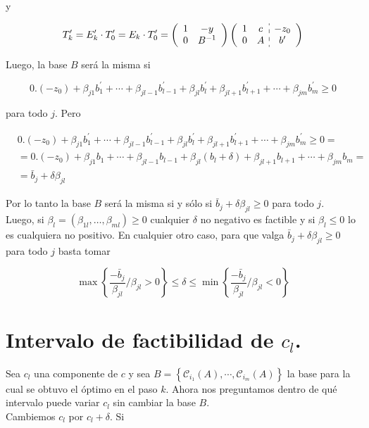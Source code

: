 \documentclass[10pt]{article}
\begin{document}
y

$$
T_{k}^{\prime}=E_{k}^{\prime} \cdot T_{0}^{\prime}=E_{k} \cdot T_{0}^{\prime}=\left(\begin{array}{cc}
1 & -y \\
0 & B^{-1}
\end{array}\right)\left(\begin{array}{cc:c}
1 & c & -z_{0} \\
0 & A & b^{\prime}
\end{array}\right)
$$

Luego, la base $B$ será la misma si

$$
0 .\left(-z_{0}\right)+\beta_{j 1} b_{1}^{\prime}+\cdots+\beta_{j l-1} b_{l-1}^{\prime}+\beta_{j l} b_{l}^{\prime}+\beta_{j l+1} b_{l+1}^{\prime}+\cdots+\beta_{j m} b_{m}^{\prime} \geq 0
$$

para todo $j$. Pero

$$
\begin{aligned}
& 0 .\left(-z_{0}\right)+\beta_{j 1} b_{1}^{\prime}+\cdots+\beta_{j l-1} b_{l-1}^{\prime}+\beta_{j l} b_{l}^{\prime}+\beta_{j l+1} b_{l+1}^{\prime}+\cdots+\beta_{j m} b_{m}^{\prime} \geq 0= \\
& =0 .\left(-z_{0}\right)+\beta_{j 1} b_{1}+\cdots+\beta_{j l-1} b_{l-1}+\beta_{j l}\left(b_{l}+\delta\right)+\beta_{j l+1} b_{l+1}+\cdots+\beta_{j m} b_{m}= \\
& =\bar{b}_{j}+\delta \beta_{j l}
\end{aligned}
$$

Por lo tanto la base $B$ será la misma si y sólo si $\bar{b}_{j}+\delta \beta_{j l} \geq 0$ para todo $j$.\\
Luego, si $\beta_{l}=\left(\beta_{1 l}, \ldots, \beta_{m l}\right) \geq 0$ cualquier $\delta$ no negativo es factible y si $\beta_{l} \leq 0$ lo es cualquiera no positivo. En cualquier otro caso, para que valga $\bar{b}_{j}+\delta \beta_{j l} \geq 0$ para todo $j$ basta tomar

$$
\max \left\{\frac{-\bar{b}_{j}}{\beta_{j l}} / \beta_{j l}>0\right\} \leq \delta \leq \min \left\{\frac{-\bar{b}_{j}}{\beta_{j l}} / \beta_{j l}<0\right\}
$$

\section*{Intervalo de factibilidad de $c_{l}$.}
Sea $c_{l}$ una componente de $c$ y sea $B=\left\{\mathcal{C}_{i_{1}}(A), \cdots, \mathcal{C}_{i_{m}}(A)\right\}$ la base para la cual se obtuvo el óptimo en el paso $k$. Ahora nos preguntamos dentro de qué intervalo puede variar $c_{l}$ sin cambiar la base $B$.\\
Cambiemos $c_{l}$ por $c_{l}+\delta$. Si
\end{document}
